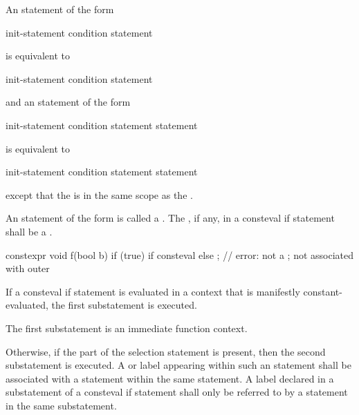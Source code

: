 \pnum
An  statement of the form
\begin{ncsimplebnf}
  \terminal{(} init-statement condition \terminal{)} statement
\end{ncsimplebnf}
is equivalent to
\begin{ncsimplebnf}
\terminal{\{}\br
\bnfindent init-statement\br
\bnfindent {}  \terminal{(} condition \terminal{)} statement\br
\terminal{\}}
\end{ncsimplebnf}
and an  statement of the form
\begin{ncsimplebnf}
  \terminal{(} init-statement condition \terminal{)} statement  statement
\end{ncsimplebnf}
is equivalent to
\begin{ncsimplebnf}
\terminal{\{}\br
\bnfindent init-statement\br
\bnfindent {}  \terminal{(} condition \terminal{)} statement  statement\br
\terminal{\}}
\end{ncsimplebnf}
except that the  is
in the same scope as the .

\pnum
An  statement of the form 
is called a .
The , if any, in a consteval if statement
shall be a .
\begin{example}
\begin{codeblock}
constexpr void f(bool b) {
  if (true)
    if consteval { }
    else ;              // error: not a ;  not associated with outer 
}
\end{codeblock}
\end{example}

\pnum
If a consteval if statement is evaluated in a context
that is manifestly constant-evaluated,
the first substatement is executed.
\begin{note}
The first substatement is an immediate function context.
\end{note}
Otherwise, if the  part of the selection statement is present,
then the second substatement is executed.
A  or  label
appearing within such an  statement
shall be associated with a  statement
within the same  statement.
A label declared in a substatement of a consteval if statement
shall only be referred to by a statement in the same substatement.

